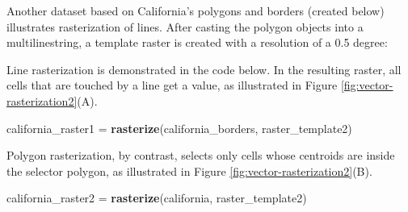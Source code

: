 \documentclass[]{krantz}
\newenvironment{Shaded}{\begin{snugshade}}{\end{snugshade}}
\newcommand{\DataTypeTok}[1]{\textcolor[rgb]{0.27,0.27,0.27}{#1}}
\newcommand{\FloatTok}[1]{\textcolor[rgb]{0.06,0.06,0.06}{#1}}
\newcommand{\KeywordTok}[1]{\textcolor[rgb]{0.27,0.27,0.27}{\textbf{#1}}}
\newcommand{\NormalTok}[1]{#1}
\newcommand{\OperatorTok}[1]{\textcolor[rgb]{0.43,0.43,0.43}{\textbf{#1}}}
\newcommand{\StringTok}[1]{\textcolor[rgb]{0.5,0.5,0.5}{#1}}
\begin{document}
Another dataset based on California's polygons and borders (created below) illustrates rasterization of lines.
After casting the polygon objects into a multilinestring, a template raster is created with a resolution of a 0.5 degree:

\begin{Shaded}
\end{Shaded}

Line rasterization is demonstrated in the code below.
In the resulting raster, all cells that are touched by a line get a value, as illustrated in Figure \ref{fig:vector-rasterization2}(A).

\begin{Shaded}
\begin{Highlighting}[]
\NormalTok{california_raster1 =}\StringTok{ }\KeywordTok{rasterize}\NormalTok{(california_borders, raster_template2) }
\end{Highlighting}
\end{Shaded}

Polygon rasterization, by contrast, selects only cells whose centroids are inside the selector polygon, as illustrated in Figure \ref{fig:vector-rasterization2}(B).

\begin{Shaded}
\begin{Highlighting}[]
\NormalTok{california_raster2 =}\StringTok{ }\KeywordTok{rasterize}\NormalTok{(california, raster_template2) }
\end{Highlighting}
\end{Shaded}
\end{document}
